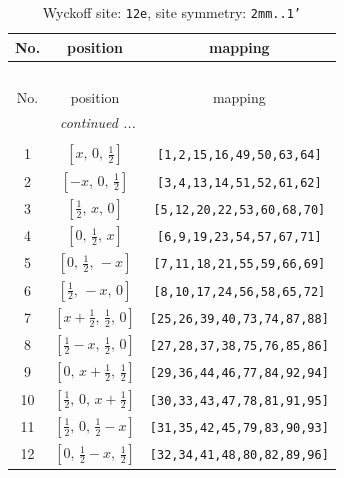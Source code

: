 \documentclass[fleqn,8pt]{jsarticle}
\begin{document}
\begin{longtable}{ccc}
\caption{Wyckoff site: {\tt 12e}, site symmetry: {\tt 2mm..1'}}
 \\
 \hline \hline
No. & position & mapping \\ \hline \endfirsthead

\multicolumn{2}{l}{\tablename\ \thetable{}} \\
 \hline \hline
No. & position & mapping \\ \hline \endhead

 \hline \hline
\multicolumn{2}{r}{\footnotesize\it continued ...} \\ \endfoot

 \hline \hline
\multicolumn{2}{r}{} \\ \endlastfoot

1 & $\left[ x,\, 0,\, \frac{1}{2} \right]$ & {\tt [1,2,15,16,49,50,63,64]} \\ \hline
2 & $\left[ - x,\, 0,\, \frac{1}{2} \right]$ & {\tt [3,4,13,14,51,52,61,62]} \\ \hline
3 & $\left[ \frac{1}{2},\, x,\, 0 \right]$ & {\tt [5,12,20,22,53,60,68,70]} \\ \hline
4 & $\left[ 0,\, \frac{1}{2},\, x \right]$ & {\tt [6,9,19,23,54,57,67,71]} \\ \hline
5 & $\left[ 0,\, \frac{1}{2},\, - x \right]$ & {\tt [7,11,18,21,55,59,66,69]} \\ \hline
6 & $\left[ \frac{1}{2},\, - x,\, 0 \right]$ & {\tt [8,10,17,24,56,58,65,72]} \\ \hline
7 & $\left[ x + \frac{1}{2},\, \frac{1}{2},\, 0 \right]$ & {\tt [25,26,39,40,73,74,87,88]} \\ \hline
8 & $\left[ \frac{1}{2} - x,\, \frac{1}{2},\, 0 \right]$ & {\tt [27,28,37,38,75,76,85,86]} \\ \hline
9 & $\left[ 0,\, x + \frac{1}{2},\, \frac{1}{2} \right]$ & {\tt [29,36,44,46,77,84,92,94]} \\ \hline
10 & $\left[ \frac{1}{2},\, 0,\, x + \frac{1}{2} \right]$ & {\tt [30,33,43,47,78,81,91,95]} \\ \hline
11 & $\left[ \frac{1}{2},\, 0,\, \frac{1}{2} - x \right]$ & {\tt [31,35,42,45,79,83,90,93]} \\ \hline
12 & $\left[ 0,\, \frac{1}{2} - x,\, \frac{1}{2} \right]$ & {\tt [32,34,41,48,80,82,89,96]} \\
\end{longtable}
\renewcommand{\arraystretch}{1.2}
\end{document}
